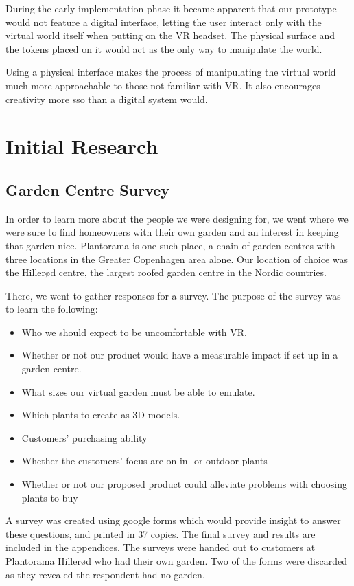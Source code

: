 During the early implementation phase it became apparent that our prototype would not feature a digital interface, letting the user interact only with the virtual world itself when putting on the VR headset. The physical surface and the tokens placed on it would act as the only way to manipulate the world.

Using a physical interface makes the process of manipulating the virtual world much more approachable to those not familiar with VR. It also encourages creativity more sso than a digital system would. 




\section{Initial Research}
\subsection{Garden Centre Survey}

In order to learn more about the people we were designing for, we went where we were sure to find homeowners with their own garden and an interest in keeping that garden nice. Plantorama is one such place, a chain of garden centres with three locations in the Greater Copenhagen area alone. Our location of choice was the Hillerød centre, the largest roofed garden centre in the Nordic countries. 

There, we went to gather responses for a survey. 
The purpose of the survey was to learn the following:

\begin{itemize}
	\item Who we should expect to be uncomfortable with VR.
	\item Whether or not our product would have a measurable impact if set up in a garden centre.
	\item What sizes our virtual garden must be able to emulate.
	\item Which plants to create as 3D models.
	\item Customers' purchasing ability
	\item Whether the customers' focus are on in- or outdoor plants
	\item Whether or not our proposed product could alleviate problems with choosing plants to buy
\end{itemize}
A survey was created using google forms which would provide insight to answer these questions, and printed in 37 copies. The final survey and results are included in the appendices. The surveys were handed out to customers at Plantorama Hillerød who had their own garden. Two of the forms were discarded as they revealed the respondent had no garden. %

